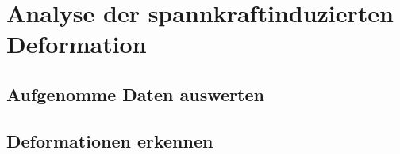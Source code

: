 \documentclass[../main.tex]{subfiles}
\begin{document}
\section{Analyse der spannkraftinduzierten Deformation}

\subsection{Aufgenomme Daten auswerten}

\subsection{Deformationen erkennen}
\end{document}
